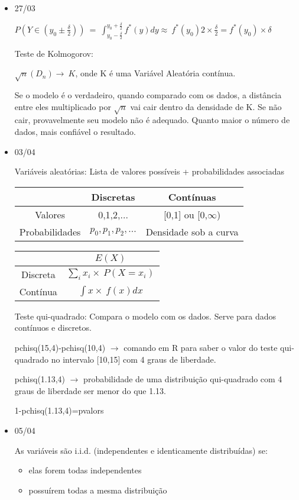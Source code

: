 \documentclass[11pt,a4paper]{book}
\begin{document}
\begin{itemize}
		\item 27/03
		
		$P(Y \in (y_0\pm \frac{\delta}{2}))~=~\int_{y_0-\frac{\delta}{2}}^{y_0+\frac{\delta}{2}}f^{*}(y)dy\approx~f^{*}(y_0)2\times\frac{\delta}{2}=f^{*}(y_0)\times\delta$
		
		Teste de Kolmogorov:
		
		$\sqrt{n}(D_n)\rightarrow~K$, onde K é uma Variável Aleatória contínua.
		
		Se o modelo é o verdadeiro, quando comparado com os dados, a distância entre eles multiplicado por $\sqrt{n}$ vai cair dentro da densidade de K.
		Se não cair, provavelmente seu modelo não é adequado.
		Quanto maior o número de dados, mais confiável o resultado.
		
		\item 03/04
		
		Variáveis aleatórias: Lista de valores possíveis + probabilidades associadas
		
		\begin{tabular}{|c|c|c|}
			\hline
			& Discretas & Contínuas\\
			\hline
			Valores & 0,1,2,...& [0,1] ou [0,$\infty$)\\
			\hline
			Probabilidades & $p_0,p_1,p_2,...$ & Densidade sob a curva\\
			\hline
		\end{tabular}
		
		\begin{tabular}{|c|c|}
		\hline
		& $E(X)$\\
		\hline
		Discreta & $\sum_i x_i\times~P(X=x_i)$\\
		\hline
		Contínua & $\int x\times~f(x)dx$\\
		\hline
		\end{tabular}
		
		Teste qui-quadrado:
		Compara o modelo com os dados.
		Serve para dados contínuos e discretos.
		
		pchisq(15,4)-pchisq(10,4) $\rightarrow $ comando em R para saber o valor do teste qui-quadrado no intervalo [10,15] com 4 graus de liberdade.
		
		pchisq(1.13,4) $\rightarrow$ probabilidade de uma distribuição qui-quadrado com 4 graus de liberdade ser menor do que 1.13.
		
		1-pchisq(1.13,4)=pvalors
		
		\item 05/04
		
		As variáveis são i.i.d. (independentes e identicamente distribuídas) se:
		\begin{itemize}
			\item elas forem todas independentes
			\item possuírem todas a mesma distribuição
		\end{itemize}
		

\end{itemize}
\end{document}
